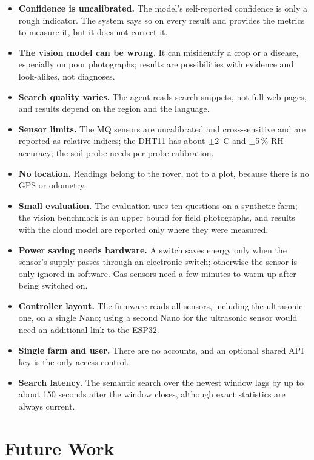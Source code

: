 \begin{itemize}
\item \textbf{Confidence is uncalibrated.} The model's self-reported confidence is only a rough indicator. The system says so on every result
      and provides the metrics to measure it, but it does not correct it.
\item \textbf{The vision model can be wrong.} It can misidentify a crop or a disease, especially on poor photographs; results are
      possibilities with evidence and look-alikes, not diagnoses.
\item \textbf{Search quality varies.} The agent reads search snippets, not full web pages, and results depend on the region and the language.
\item \textbf{Sensor limits.} The MQ sensors are uncalibrated and cross-sensitive and are reported as relative indices; the DHT11 has about $\pm$2\,$^{\circ}$C and
      $\pm$5\,\% RH accuracy; the soil probe needs per-probe calibration.
\item \textbf{No location.} Readings belong to the rover, not to a plot, because there is no GPS or odometry.
\item \textbf{Small evaluation.} The evaluation uses ten questions on a synthetic farm; the vision benchmark is an upper bound for field
      photographs, and results with the cloud model are reported only where they were measured.
\item \textbf{Power saving needs hardware.} A switch saves energy only when the sensor's supply passes through an electronic switch; otherwise the sensor is only ignored in software.
      Gas sensors need a few minutes to warm up after being switched on.
\item \textbf{Controller layout.} The firmware reads all sensors, including the ultrasonic one, on a single Nano; using a second Nano for the ultrasonic sensor would need an
      additional link to the ESP32.
\item \textbf{Single farm and user.} There are no accounts, and an optional shared API key is the only access control.
\item \textbf{Search latency.} The semantic search over the newest window lags by up to about 150 seconds after the window closes, although exact statistics are always current.
\end{itemize}

\section{Future Work}

